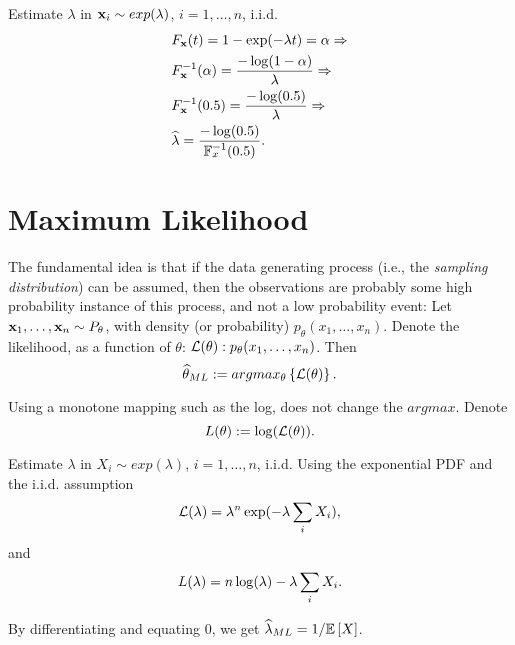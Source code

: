 \begin{example}
Estimate $\lambda$ in $\mathbf{x}_i \sim exp(\lambda)$, $i=1,\dots,n$, i.i.d.
\begin{align*}
	& F_{\mathbf{x}} (t) = 1-\exp(-\lambda t) = \alpha \Rightarrow \\
	& F_{\mathbf{x}}^{-1} (\alpha) = \frac{-\log(1-\alpha)}{\lambda} \Rightarrow \\
	& F_{\mathbf{x}}^{-1} (0.5) = \frac{-\log(0.5)}{\lambda} \Rightarrow \\
	& \widehat{\lambda} = \frac{-\log(0.5)}{\mathbb{F}^{-1}_{x}(0.5)}.
\end{align*}

\end{example}


\section{Maximum Likelihood}
\label{sec:ml}

The fundamental idea is that if the data generating process (i.e., the \emph{sampling distribution}) can be assumed, then the observations are probably some high probability instance of this process, and not a low probability event:
Let $\mathbf{x}_1,\dots,\mathbf{x}_n \sim P_\theta$, with density (or probability) $p_\theta(x_1,\dots,x_n)$.
Denote the likelihood, as a function of $\theta$: $\mathcal{L}(\theta): p_\theta(x_1,\dots,x_n)$.
Then $$\widehat{\theta}_{ML}:= argmax_{\theta}\left\{  \mathcal{L}(\theta)  \right\}.$$

Using a monotone mapping such as the log, does not change the $argmax$. 
Denote $$L(\theta):=\log(\mathcal{L}(\theta)).$$

 
\begin{example}

Estimate $\lambda$ in $X_i \sim exp(\lambda)$, $i=1,\dots,n$, i.i.d.
Using the exponential PDF and the i.i.d. assumption
$$ \mathcal{L}(\lambda) = \lambda^n \exp(-\lambda \sum_i X_i), $$
and 
$$ L(\lambda) = n \log(\lambda) -\lambda \sum_i X_i. $$

By differentiating and equating $0$, we get $\widehat{\lambda}_{ML}=1/\mathbb{E}\left[X\right]$.

\end{example}

